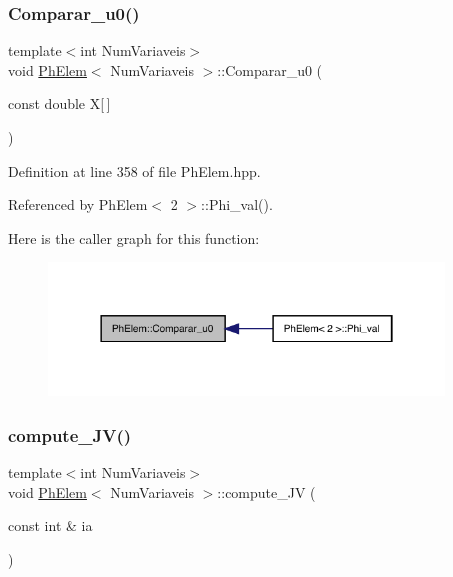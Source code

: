 \subsubsection{\texorpdfstring{Comparar\+\_\+u0()}{Comparar\_u0()}}
{\footnotesize\ttfamily template$<$int Num\+Variaveis$>$ \\
void \hyperlink{classPhElem}{Ph\+Elem}$<$ Num\+Variaveis $>$\+::Comparar\+\_\+u0 (\begin{DoxyParamCaption}\item[{const double}]{X\mbox{[}$\,$\mbox{]} }\end{DoxyParamCaption})}



Definition at line 358 of file Ph\+Elem.\+hpp.



Referenced by Ph\+Elem$<$ 2 $>$\+::\+Phi\+\_\+val().

Here is the caller graph for this function\+:
\nopagebreak
\begin{figure}[H]
\begin{center}
\leavevmode
\includegraphics[width=298pt]{classPhElem_a9ea744b94e057733c1d396d9f46ddcce_icgraph}
\end{center}
\end{figure}
\mbox{\label{classPhElem_abc4450898733d818edaa51a7f0d2bb58}} 
\subsubsection{\texorpdfstring{compute\+\_\+\+J\+V()}{compute\_JV()}}
{\footnotesize\ttfamily template$<$int Num\+Variaveis$>$ \\
void \hyperlink{classPhElem}{Ph\+Elem}$<$ Num\+Variaveis $>$\+::compute\+\_\+\+JV (\begin{DoxyParamCaption}\item[{const int \&}]{ia }\end{DoxyParamCaption})}



